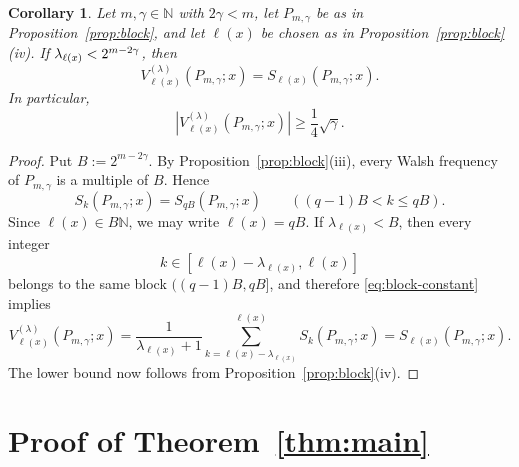 \documentclass[11pt]{amsart}
\numberwithin{equation}{section}
\theoremstyle{plain}
\newtheorem{corollary}[theorem]{Corollary}
\begin{document}
\begin{corollary}
\label{cor:VP-equals-partial} Let $m,\gamma\in\mathbb{N}$ with $2\gamma<m$,
let $P_{m,\gamma}$ be as in Proposition~\ref{prop:block}, and let $\ell(x)$
be chosen as in Proposition~\ref{prop:block}(iv). If $\lambda_{%
\ell(x)}<2^{m-2\gamma}$, then 
\begin{equation*}
V_{\ell(x)}^{(\lambda)}(P_{m,\gamma};x)=S_{\ell(x)}(P_{m,\gamma};x).
\end{equation*}
In particular, 
\begin{equation*}
|V_{\ell(x)}^{(\lambda)}(P_{m,\gamma};x)|\ge \frac14\sqrt{\gamma}.
\end{equation*}
\end{corollary}

\begin{proof}
Put $B:=2^{m-2\gamma}$. By Proposition~\ref{prop:block}(iii), every Walsh
frequency of $P_{m,\gamma}$ is a multiple of $B$. Hence 
\begin{equation}  \label{eq:block-constant}
S_k(P_{m,\gamma};x)=S_{qB}(P_{m,\gamma};x) \qquad ((q-1)B<k\le qB).
\end{equation}
Since $\ell(x)\in B\mathbb{N}$, we may write $\ell(x)=qB$. If $%
\lambda_{\ell(x)}<B$, then every integer 
\begin{equation*}
k\in [\ell(x)-\lambda_{\ell(x)},\ell(x)]
\end{equation*}
belongs to the same block $((q-1)B,qB]$, and therefore %
\eqref{eq:block-constant} implies 
\begin{equation*}
V_{\ell(x)}^{(\lambda)}(P_{m,\gamma};x)=\frac{1}{\lambda_{\ell(x)}+1}%
\sum_{k=\ell(x)-\lambda_{\ell(x)}}^{\ell(x)}
S_k(P_{m,\gamma};x)=S_{\ell(x)}(P_{m,\gamma};x).
\end{equation*}
The lower bound now follows from Proposition~\ref{prop:block}(iv).
\end{proof}

\section{Proof of Theorem~\protect\ref{thm:main}}
\end{document}
